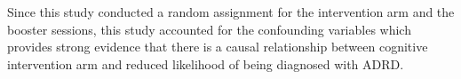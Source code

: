\documentclass[11pt]{article}
\begin{document}
Since this study conducted a random assignment for the intervention arm and the booster sessions, this study accounted for the confounding variables which provides strong evidence that there is a causal relationship between cognitive intervention arm and reduced likelihood of being diagnosed with ADRD.
\end{document}
